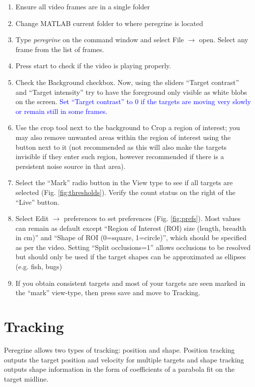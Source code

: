 \documentclass[12pt]{article}
\begin{document}
\begin{enumerate}
\item Ensure all video frames are in a single folder
\item Change MATLAB current folder to where peregrine is located
\item Type \emph{peregrine} on the command window and select File $\rightarrow$ open. Select any frame from the list of frames.
\item Press start to check if the video is playing properly.
\item Check the Background checkbox. Now, using the sliders ``Target contrast'' and ``Target intensity'' try to have the foreground only visible as white blobs on the screen. \textcolor{blue}{Set ``Target contrast'' to 0 if the targets are moving very slowly or remain still in some frames.}
\item Use the crop tool next to the background to Crop a region of interest; you may also remove unwanted areas within the region of interest using the button next to it (not recommended as this will also make the targets invisible if they enter such region, however recommended if there is a persistent noise source in that area).
\item Select the ``Mark'' radio button in the View type to see if all targets are selected (Fig. \ref{fig:thresholds}). Verify the count status on the right of the ``Live'' button.
\item Select Edit $\rightarrow$ preferences to set preferences (Fig. \ref{fig:prefs}). Most values can remain as default except ``Region of Interest (ROI) size (length, breadth in cm)'' and ``Shape of ROI (0=square, 1=circle)'', which should be specified as per the video. Setting ``Split occlusions=1'' allows occlusions to be resolved but should only be used if the target shapes can be approximated as ellipses (e.g. fish, bugs)
\item If you obtain consistent targets and most of your targets are seen marked in the ``mark'' view-type, then press save and move to Tracking.
\end{enumerate}


\section{Tracking}
Peregrine allows two types of tracking: position and shape. Position tracking outputs the target position and velocity for multiple targets and shape tracking outputs shape information in the form of coefficients of a parabola fit on the target midline. 
\end{document}
